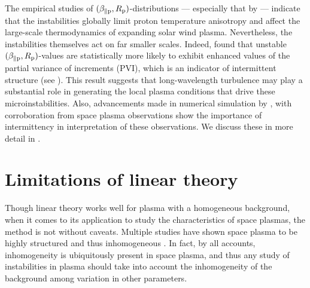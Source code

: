         The empirical studies of $(\beta_{\parallel \rm p},R_{\rm p})$-distributions --- especially
        that by \citet{Matteini2007} --- indicate that the instabilities globally limit proton
        temperature anisotropy and affect the large-scale thermodynamics of expanding solar wind
        plasma. Nevertheless, the instabilities themselves act on far smaller scales. Indeed,
        \cite{Osman2012} found that unstable $(\beta_{\parallel \rm p},R_{\rm p})$-values are
        statistically more likely to exhibit enhanced values of the partial variance of increments
        (PVI), which is an indicator of intermittent structure (see ). This result
        suggests that long-wavelength turbulence may play a substantial role in generating the local
        plasma conditions that drive these microinstabilities. Also, advancements made in numerical
        simulation by \citet{Servidio2012a, Greco2012, Servidio2015}, with corroboration from space
        plasma observations \citep{Marsch1992, Sorriso-Valvo1999, Osman2011, Osman2012, Kiyani2009}
        show the importance of intermittency in interpretation of these observations. We discuss
        these in more detail in .

    \section{Limitations of linear theory}\label{sec:conc2}

        Though linear theory works well for plasma with a homogeneous background, when it comes to
        its application to study the characteristics of space plasmas, the method is not without
        caveats. Multiple studies have shown space plasma to be highly structured and thus
        inhomogeneous \citep{Burlaga1968, Tsurutani1979, Ness2001, Osman2012, Osman2012a,
        Greco2012}. In fact, by all accounts, inhomogeneity is ubiquitously present in space plasma,
        and thus any study of instabilities in plasma should take into account the inhomogeneity of
        the background among variation in other parameters.

